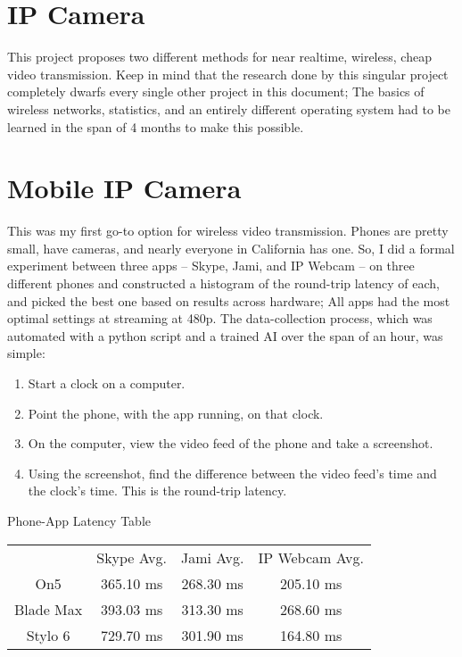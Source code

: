 \section{IP Camera}

This project proposes two different methods for near realtime, wireless, cheap video transmission. Keep in mind that the research done by this singular project completely dwarfs every single other project in this document; The basics of wireless networks, statistics, and an entirely different operating system had to be learned in the span of 4 months to make this possible.

\section{Mobile IP Camera}

This was my first go-to option for wireless video transmission. Phones are pretty small, have cameras, and nearly everyone in California has one. So, I did a formal experiment between three apps -- Skype, Jami, and IP Webcam -- on three different phones and constructed a histogram of the round-trip latency of each, and picked the best one based on results across hardware; All apps had the most optimal settings at streaming at 480p. The data-collection process, which was automated with a python script and a trained AI over the span of an hour, was simple:

\begin{enumerate}
\item{Start a clock on a computer.}
\item{Point the phone, with the app running, on that clock.}
\item{On the computer, view the video feed of the phone and take a screenshot.}
\item{Using the screenshot, find the difference between the video feed's time and the clock's time. This is the round-trip latency. }
\end{enumerate}

\begin{centering}
Phone-App Latency Table\\[0.5cm]

\begin{tabular}{c|c|c|c}
    & Skype Avg. & Jami Avg. & IP Webcam Avg. \\[0.5cm]
    On5 & 365.10 ms & 268.30 ms & 205.10 ms \\[0.5cm]
    Blade Max & 393.03 ms & 313.30 ms & 268.60 ms \\[0.5cm]
    Stylo 6 & 729.70 ms & 301.90 ms & 164.80 ms
\end{tabular} \newline

\end{centering}


